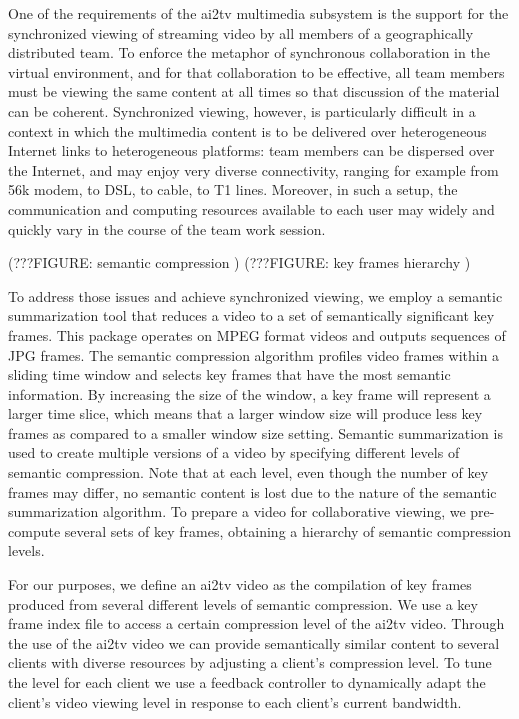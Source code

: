 \documentclass{sig-alternate}
\begin{document}
One of the requirements of the ai2tv multimedia subsystem
is the support for the synchronized viewing of streaming video by all
members of a geographically distributed team. To enforce the metaphor
of synchronous collaboration in the virtual environment, and for that
collaboration to be effective, all team members must be viewing the
same content at all times so that discussion of the material can be
coherent.  Synchronized viewing, however, is particularly difficult in
a context in which the multimedia content is to be delivered over
heterogeneous Internet links to heterogeneous platforms: team members
can be dispersed over the Internet, and may enjoy very diverse
connectivity, ranging for example from 56k modem, to DSL, to cable, to
T1 lines.  Moreover, in such a setup, the communication and computing
resources available to each user may widely and quickly vary in the
course of the team work session.

(???FIGURE: semantic compression )
(???FIGURE: key frames hierarchy )


To address those issues and achieve synchronized viewing, we employ a
semantic summarization tool \cite{TIECHENG} that reduces a video to a
set of semantically significant key frames.  This package operates on
MPEG format videos and outputs sequences of JPG frames.  The semantic
compression algorithm profiles video frames within a sliding time
window and selects key frames that have the most semantic information.
By increasing the size of the window, a key frame will represent a
larger time slice, which means that a larger window size will produce
less key frames as compared to a smaller window size setting.
Semantic summarization is used to create multiple versions of a video
by specifying different levels of semantic compression.  Note that at
each level, even though the number of key frames may differ, no
semantic content is lost due to the nature of the semantic
summarization algorithm.  To prepare a video for collaborative
viewing, we pre-compute several sets of key frames, obtaining a
hierarchy of semantic compression levels.

For our purposes, we define an ai2tv video as the
compilation of key frames produced from several different levels of
semantic compression.  We use a key frame index file to access a
certain compression level of the ai2tv video.  Through the
use of the ai2tv video we can provide semantically similar
content to several clients with diverse resources by adjusting a
client's compression level.  To tune the level for each client we use
a feedback controller to dynamically adapt the client's video viewing
level in response to each client's current bandwidth.
\end{document}
